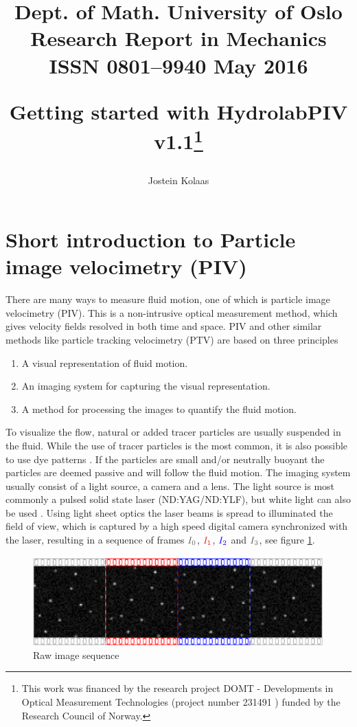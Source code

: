 \documentclass[10pt]{article}
\title{\vspace*{-1.5cm}
\begin{flushright}
\begin{minipage}{4.5cm}
\tiny{\sc Dept. of Math. \hfill University of Oslo\\Research Report in Mechanics \\ISSN 0801--9940 \hfill May 2016}
\end{minipage}
\end{flushright}
\vskip 1cm Getting started with HydrolabPIV v1.1\thanks{This work was financed by the research project DOMT - Developments in Optical Measurement Technologies (project number 231491 ) funded by the Research Council of Norway.}}
\author[1]{Jostein Kolaas}
\affil[1]{Department of Mathematics, University of Oslo}
\newcommand{\fa}[0]{\ensuremath{{\color{mygray}I_0}}}
\newcommand{\fb}[0]{\ensuremath{{\color{red}I_1}}}
\newcommand{\fc}[0]{\ensuremath{{\color{blue}I_2}}}
\newcommand{\fd}[0]{\ensuremath{{\color{mygray}I_3}}}
\begin{document}
  \maketitle
\section{Short introduction to Particle image velocimetry (PIV)}
There are many ways to measure fluid motion, one of which is particle image velocimetry (PIV).
This is a non-intrusive optical measurement method,
which gives velocity fields resolved in both time and space.
PIV and other similar methods like particle tracking velocimetry (PTV) are based on three principles \citep{Sveen2004}
\begin{enumerate}
 \item A visual representation of fluid motion.
 \item An imaging system for capturing the visual representation.
 \item A method for processing the images to quantify the fluid motion.
\end{enumerate}
To visualize the flow, natural or added tracer particles are usually suspended in the fluid.
While the use of tracer particles is the most common, it is also possible to use dye patterns \citep{Raffel2007}.
If the particles are small and/or neutrally buoyant the particles are deemed passive and will follow the fluid motion.
The imaging system usually consist of a light source, a camera and a lens.
The light source is most commonly a pulsed solid state laser (ND:YAG/ND:YLF), but white light can also be used \citep{Raffel2007}.
Using light sheet optics the laser beams is spread to illuminated the field of view,
which is captured by a high speed digital camera synchronized with the laser, resulting in a sequence of frames 
$\fa$, $\fb$, $\fc$ and $\fd$, see figure \ref{rawseq}.


\begin{figure}[htp]
  \centering
  \includegraphics[width=.9\textwidth]{rawsequence20140620}
  \caption{Raw image sequence}
  \label{rawseq}
\end{figure}
\end{document}
